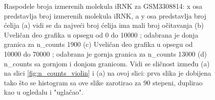 \documentclass{article}
\begin{document}
\begin{figure}[H]
    \centering
    \caption{ Raspodele broja izmerenih molekula iRNK za GSM3308814: x osa predstavlja broj izmerenih molekula iRNK, a y osa predstavlja broj ćelija (a) vidi se da najveći broj ćelija ima mali broj očitavanja (b) Uveličan deo grafika u opsegu od 0 do 10000 ; odabrana je donja granica za n\_counts 1900 (c) Uveličan deo grafika u opsegu od 10000 do 70000 ; odabrana je gornja granica za n\_counts 13000 (d) n\_counts sa gornjom i donjom granicom. Vidi se sličnost između (a) na slici \ref{fig:n_counts_violin} i (a) na ovoj slici: prva slika je dobijena tako što se histogram sa ove slike zarotirao za 90 stepeni, duplirao kao u ogledalu i "uglačao". }
    \label{fig:n_counts_GSM3308814_hist_qc}
\end{figure}
\end{document}
